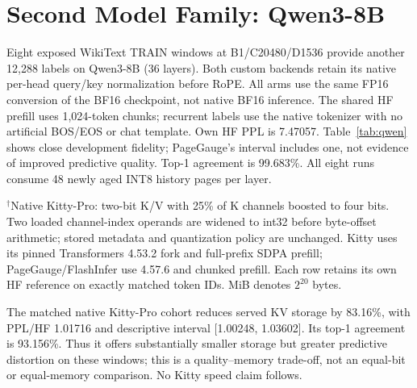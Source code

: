 \documentclass{article}
\begin{document}
\section{Second Model Family: Qwen3-8B}
Eight exposed WikiText TRAIN windows at B1/C20480/D1536 provide another
12,288 labels on Qwen3-8B (36 layers). Both custom backends retain its native
per-head query/key normalization before RoPE. All arms use the same FP16
conversion of the BF16 checkpoint, not native BF16 inference. The shared HF
prefill uses 1,024-token chunks; recurrent labels use the native tokenizer with
no artificial BOS/EOS or chat template. Own HF PPL is 7.47057. Table~\ref{tab:qwen}
shows close development fidelity; PageGauge's interval includes one, not
evidence of improved predictive quality. Top-1 agreement is 99.683\%.
All eight runs consume 48 newly aged INT8 history pages per layer.

\begin{table}[t]
\caption{Qwen3-8B development quality and allocated served KV storage.
Eight windows, 12,288 labels; descriptive paired-window intervals.
These are not speed, generated-task, independent TEST, or non-inferiority results.}
\label{tab:qwen}\centering\small

\par\smallskip\footnotesize
$^\dagger$Native Kitty-Pro: two-bit K/V with 25\% of K channels boosted to
four bits. Two loaded channel-index operands are widened to int32 before
byte-offset arithmetic; stored metadata and quantization policy are unchanged.
Kitty uses its pinned Transformers 4.53.2 fork and full-prefix SDPA prefill;
PageGauge/FlashInfer use 4.57.6 and chunked prefill. Each row retains its own
HF reference on exactly matched token IDs. MiB denotes $2^{20}$ bytes.
\end{table}

\begin{table}[t]
\caption{CPU-backed common-engine timing pilot, B4/C20480/D1536. Step latency
is for the whole batch; throughput counts four output tokens per step.
Ranges are the minimum and maximum of three within-process repeats, not
confidence intervals. Peak allocation includes weights and native temporary
allocations during timed decode; GiB denotes $2^{30}$ bytes.}
\label{tab:frontier}\centering\small

\end{table}

The matched native Kitty-Pro cohort reduces served KV storage by 83.16\%,
with PPL/HF 1.01716 and descriptive interval [1.00248, 1.03602]. Its top-1
agreement is 93.156\%. Thus it offers substantially smaller storage but greater
predictive distortion on these windows; this is a quality--memory trade-off,
not an equal-bit or equal-memory comparison. No Kitty speed claim follows.
\end{document}
